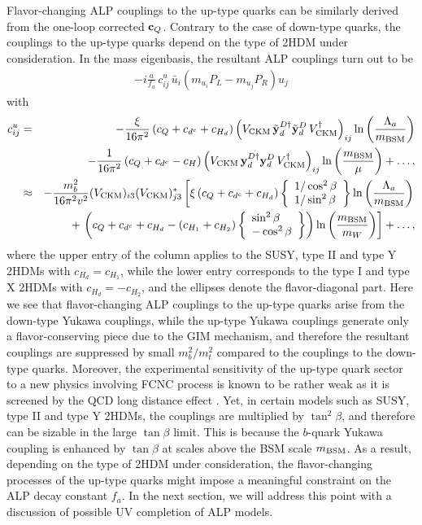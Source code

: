 \documentclass[preprint,prd,aps,tighten,nofootinbib,amssymb]{revtex4}
\newcommand{\bea}{\begin{eqnarray}}
\newcommand{\eea}{\end{eqnarray}}
\newcommand{\dis}[1]{\begin{equation}\begin{split}#1\end{split}\end{equation}}
\def\vpq{f_{a}}
\newcommand{\C}{\bold c}
\newcommand{\Y}{\tilde{\bold  y}}
\newcommand{\y}{\bold y}
\begin{document}
Flavor-changing  ALP couplings to the up-type quarks can be similarly derived from the one-loop corrected $\C_Q$. 
Contrary to the case of down-type quarks, the couplings to the up-type quarks  depend   on the type of 2HDM under consideration.
In the mass eigenbasis, the resultant  ALP couplings turn out to be
\dis{ 
-i \frac{a}{\vpq}\, c^u_{ij}\, \bar{u}_i \left(m_{u_i} P_L - m_{u_j} P_R \right) u_j 
\label{eq:upFCNCoperator}
}
with
 \bea
\label{fcnc_up}
c^u_{ij} &=&  -\frac{\xi}{16\pi^2}  \left(c_Q+c_{d^c} +c_{H_d}\right)\left(V_{\rm CKM}\,  \Y_{d}^{D \dagger} \Y_{d}^D \,V_{\rm CKM}^\dagger \right)_{ij} \ln\left(\frac{\Lambda_a}{m_{\rm BSM}}\right) \nonumber \\
&&-\frac{1}{16\pi^2} \left(c_Q+c_{d^c} -c_{H}\right)\left(V_{\rm CKM} \, \y_{d}^{D \dagger} \y_{d}^D \, V_{\rm CKM}^\dagger  \right)_{ij} \ln\left(\frac{m_{\rm BSM}}{\mu}\right) + \dots,
\nonumber \\ 
&\approx&  -\frac{m_b^2}{16\pi^2 v^2} (V_{\rm CKM})_{i 3} (V_{\rm CKM})_{j 3}^* 
\left[\xi \left(c_Q+c_{d^c}+c_{H_d}\right) \left\{ \begin{array}{l}
1/\cos^2 \beta \\
1/\sin^2 \beta
\end{array}\right\}
 \ln\left(\frac{\Lambda_a}{m_{\rm BSM}}\right)\right.\nonumber \\
 &&\left.+\, \left(c_Q+c_{d^c}+c_{H_d}-(c_{H_1}+c_{H_2})\left\{ \begin{array}{l}
\sin^2 \beta \\
-\cos^2 \beta
\end{array}\right\}\right)\ln\left(\frac{m_{\rm BSM}}{m_W}\right) 
 \right] + \dots,
 \eea
where the upper entry of the column applies to the SUSY, type II and type Y 2HDMs with $c_{H_d} = c_{H_1}$, while the lower entry corresponds to the type I and type X 2HDMs with $c_{H_d} = -c_{H_2}$, and the ellipses denote the flavor-diagonal part.
Here we see that flavor-changing ALP couplings to the up-type quarks arise from the down-type Yukawa couplings, while the up-type Yukawa couplings generate only a flavor-conserving piece due to the GIM mechanism, and therefore the resultant couplings are suppressed by small $m_b^2/m_t^2$ compared to the couplings to the down-type quarks. 
Moreover, the experimental sensitivity of the up-type quark sector to a new physics involving FCNC process is known to be rather weak as it is screened by the QCD long distance effect \cite{Burdman:2001tf}.    
Yet, in certain models such as SUSY,  type II  and type Y 2HDMs, the couplings are multiplied by $\tan^2 \beta$, and therefore can be sizable in the large  $\tan \beta$ limit. This is because the $b$-quark Yukawa coupling is enhanced by $\tan \beta$ at scales above the BSM scale $m_{\rm BSM}$.  
As a result,  depending on the type of 2HDM under consideration, the flavor-changing processes of the up-type quarks  might impose a meaningful constraint on the ALP decay constant $\vpq$. In the next section, we will address this point  with a discussion of possible UV completion of ALP models.
 
\end{document}
